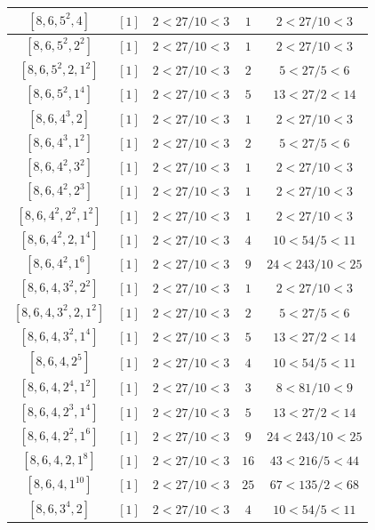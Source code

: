 \documentclass{article}%
\begin{document}
\begin{center}
\begin{longtable}{||c|c|c|c|c||}
$[8, 6, 5^{2}, 4]$ & $[1]$ & $2 < 27/10 < 3$ & $1$ & $2 < 27/10 < 3$ \\ \hline 
$[8, 6, 5^{2}, 2^{2}]$ & $[1]$ & $2 < 27/10 < 3$ & $1$ & $2 < 27/10 < 3$ \\ \hline 
$[8, 6, 5^{2}, 2, 1^{2}]$ & $[1]$ & $2 < 27/10 < 3$ & $2$ & $5 < 27/5 < 6$ \\ \hline 
$[8, 6, 5^{2}, 1^{4}]$ & $[1]$ & $2 < 27/10 < 3$ & $5$ & $13 < 27/2 < 14$ \\ \hline 
$[8, 6, 4^{3}, 2]$ & $[1]$ & $2 < 27/10 < 3$ & $1$ & $2 < 27/10 < 3$ \\ \hline 
$[8, 6, 4^{3}, 1^{2}]$ & $[1]$ & $2 < 27/10 < 3$ & $2$ & $5 < 27/5 < 6$ \\ \hline 
$[8, 6, 4^{2}, 3^{2}]$ & $[1]$ & $2 < 27/10 < 3$ & $1$ & $2 < 27/10 < 3$ \\ \hline 
$[8, 6, 4^{2}, 2^{3}]$ & $[1]$ & $2 < 27/10 < 3$ & $1$ & $2 < 27/10 < 3$ \\ \hline 
$[8, 6, 4^{2}, 2^{2}, 1^{2}]$ & $[1]$ & $2 < 27/10 < 3$ & $1$ & $2 < 27/10 < 3$ \\ \hline 
$[8, 6, 4^{2}, 2, 1^{4}]$ & $[1]$ & $2 < 27/10 < 3$ & $4$ & $10 < 54/5 < 11$ \\ \hline 
$[8, 6, 4^{2}, 1^{6}]$ & $[1]$ & $2 < 27/10 < 3$ & $9$ & $24 < 243/10 < 25$ \\ \hline 
$[8, 6, 4, 3^{2}, 2^{2}]$ & $[1]$ & $2 < 27/10 < 3$ & $1$ & $2 < 27/10 < 3$ \\ \hline 
$[8, 6, 4, 3^{2}, 2, 1^{2}]$ & $[1]$ & $2 < 27/10 < 3$ & $2$ & $5 < 27/5 < 6$ \\ \hline 
$[8, 6, 4, 3^{2}, 1^{4}]$ & $[1]$ & $2 < 27/10 < 3$ & $5$ & $13 < 27/2 < 14$ \\ \hline 
$[8, 6, 4, 2^{5}]$ & $[1]$ & $2 < 27/10 < 3$ & $4$ & $10 < 54/5 < 11$ \\ \hline 
$[8, 6, 4, 2^{4}, 1^{2}]$ & $[1]$ & $2 < 27/10 < 3$ & $3$ & $8 < 81/10 < 9$ \\ \hline 
$[8, 6, 4, 2^{3}, 1^{4}]$ & $[1]$ & $2 < 27/10 < 3$ & $5$ & $13 < 27/2 < 14$ \\ \hline 
$[8, 6, 4, 2^{2}, 1^{6}]$ & $[1]$ & $2 < 27/10 < 3$ & $9$ & $24 < 243/10 < 25$ \\ \hline 
$[8, 6, 4, 2, 1^{8}]$ & $[1]$ & $2 < 27/10 < 3$ & $16$ & $43 < 216/5 < 44$ \\ \hline 
$[8, 6, 4, 1^{10}]$ & $[1]$ & $2 < 27/10 < 3$ & $25$ & $67 < 135/2 < 68$ \\ \hline 
$[8, 6, 3^{4}, 2]$ & $[1]$ & $2 < 27/10 < 3$ & $4$ & $10 < 54/5 < 11$ \\ \hline 

\end{longtable}
\end{center}
\end{document}
